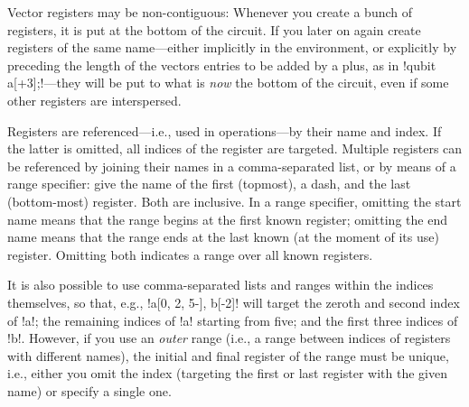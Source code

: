 \documentclass{scrartcl}
\def\texlink{\link\tex}
\begin{document}
         Vector registers may be non\hyp contiguous: Whenever you create a bunch of registers, it is put at the bottom of the circuit.
         If you later on again create registers of the same name---either implicitly in the \texlink{yquant*} environment, or explicitly by preceding the length of the vectors entries to be added by a plus, as in \yquant!qubit a[+3];!---they will be put to what is \emph{now} the bottom of the circuit, even if some other registers are interspersed.

         Registers are referenced---i.e., used in operations---by their name and index.
         If the latter is omitted, all indices of the register are targeted.
         Multiple registers can be referenced by joining their names in a comma\hyp separated list, or by means of a range specifier: give the name of the first (topmost), a dash, and the last (bottom\hyp most) register.
         Both are inclusive.
         In a range specifier, omitting the start name means that the range begins at the first known register; omitting the end name means that the range ends at the last known (at the moment of its use) register.
         Omitting both indicates a range over all known registers.

         It is also possible to use comma\hyp separated lists and ranges within the indices themselves, so that, e.g., \yquant!a[0, 2, 5-], b[-2]! will target the zeroth and second index of \yquant!a!; the remaining indices of \yquant!a! starting from five; and the first three indices of \yquant!b!.
         However, if you use an \emph{outer} range (i.e., a range between indices of registers with different names), the initial and final register of the range must be unique, i.e., either you omit the index (targeting the first or last register with the given name) or specify a single one.
\end{document}

